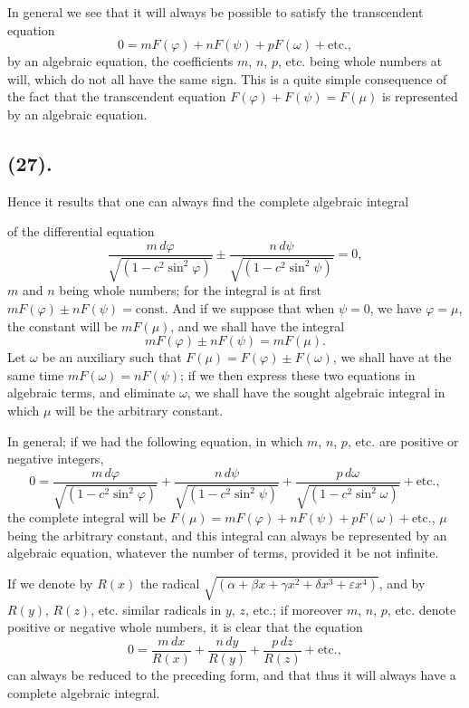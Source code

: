 \documentclass{article}
\begin{document}
In general we see that it will always be possible to satisfy the transcendent equation
\[ 0=mF(\varphi)+nF(\psi)+pF(\omega)+\text{etc.}, \]
by an algebraic equation, the coefficients $m$, $n$, $p$, etc. being whole numbers at will, which do not all have the same sign. This is a quite simple consequence of the fact that the transcendent equation $F(\varphi)+F(\psi)=F(\mu)$ is represented by an algebraic equation.

\subsection*{(27).}

Hence it results that one can always find the complete algebraic integral

of the differential equation
\[ \frac{m\,d\varphi}{\sqrt{(1-c^{2}\sin^{2}\varphi)}}\pm\frac{n\,d\psi}{\sqrt{(1-c^{2}\sin^{2}\psi)}}=0, \]
$m$ and $n$ being whole numbers; for the integral is at first $mF(\varphi)\pm nF(\psi)=\text{const.}$ And if we suppose that when $\psi=0$, we have $\varphi=\mu$, the constant will be $mF(\mu)$, and we shall have the integral
\[ mF(\varphi)\pm nF(\psi)=mF(\mu). \]
Let $\omega$ be an auxiliary such that $F(\mu)=F(\varphi)\pm F(\omega)$, we shall have at the same time $mF(\omega)=nF(\psi)$; if we then express these two equations in algebraic terms, and eliminate $\omega$, we shall have the sought algebraic integral in which $\mu$ will be the arbitrary constant.

In general; if we had the following equation, in which $m$, $n$, $p$, etc. are positive or negative integers,
\[ 0=\frac{m\,d\varphi}{\sqrt{(1-c^{2}\sin^{2}\varphi)}}+\frac{n\,d\psi}{\sqrt{(1-c^{2}\sin^{2}\psi)}}+\frac{p\,d\omega}{\sqrt{(1-c^{2}\sin^{2}\omega)}}+\text{etc.}, \]
the complete integral will be $F(\mu)=mF(\varphi)+nF(\psi)+pF(\omega)+\text{etc.}$, $\mu$ being the arbitrary constant, and this integral can always be represented by an algebraic equation, whatever the number of terms, provided it be not infinite.

If we denote by $R(x)$ the radical $\sqrt{(\alpha+\beta x+\gamma x^{2}+\delta x^{3}+\varepsilon x^{4})}$, and by $R(y)$, $R(z)$, etc. similar radicals in $y$, $z$, etc.; if moreover $m$, $n$, $p$, etc. denote positive or negative whole numbers, it is clear that the equation
\[ 0=\frac{m\,dx}{R(x)}+\frac{n\,dy}{R(y)}+\frac{p\,dz}{R(z)}+\text{etc.}, \]
can always be reduced to the preceding form, and that thus it will always have a complete algebraic integral.
\end{document}
